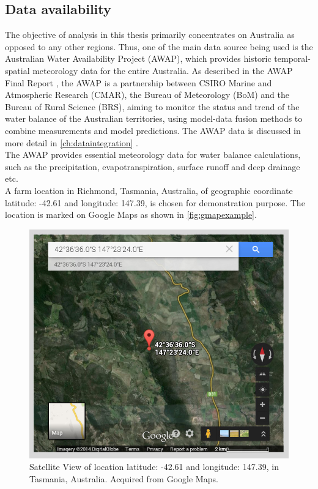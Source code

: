 \subsection{Data availability}\label{subsection:dataavailability}
The objective of analysis in this thesis primarily concentrates on Australia as opposed to any other regions. Thus, one of the main data source being used is the Australian Water Availability Project (AWAP), which provides historic temporal-spatial meteorology data for the entire Australia. As described in the AWAP Final Report \citep{Raupach2009}, the AWAP is a partnership between CSIRO Marine and Atmospheric Research (CMAR), the Bureau of Meteorology (BoM) and the Bureau of Rural Science (BRS), aiming to monitor the status and trend of the water balance of the Australian territories, using model-data fusion methods to combine measurements and model predictions. The AWAP data is discussed in more detail in \autoref{ch:dataintegration} .\\
\newline
The AWAP provides essential meteorology data for water balance calculations, such as the precipitation, evapotranspiration, surface runoff and deep drainage etc.\\
\newline
A farm location in Richmond, Tasmania, Australia, of geographic coordinate latitude: -42.61 and longitude: 147.39, is chosen for demonstration purpose. The location is marked on Google Maps\citep{Google2014} as shown in \autoref{fig:gmapexample}.\\
\begin{figure}[hbt]
\begin{center}
\includegraphics[width=0.75\linewidth]{gfx/gmapexample}
\end{center}
\caption{Satellite View of location latitude: -42.61 and longitude: 147.39, in Tasmania, Australia. Acquired from Google Maps.}
\label{fig:gmapexample}
\end{figure}
